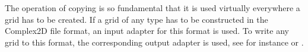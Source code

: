 
The operation of copying is so fundamental that
it is used virtually everywhere a grid has to be created.
If a grid of any type has to be constructed in the 
Complex2D file format, 
an input  adapter 
for this format is used.
To write any grid to this format,
the corresponding output adapter
is used, see for instance 
or .



~
~
~
~
